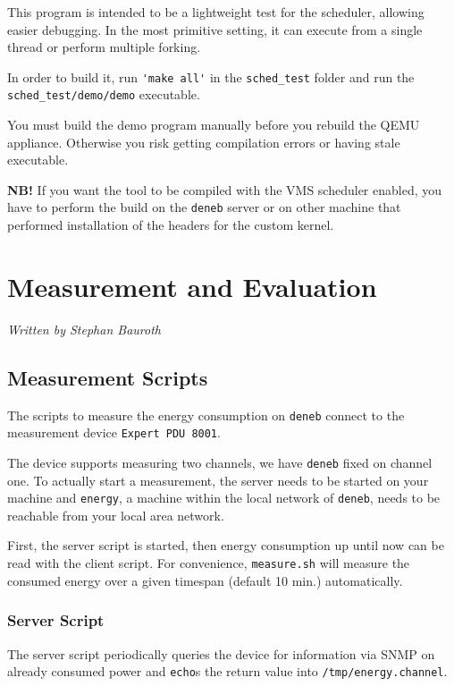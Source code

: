 \documentclass[]{report}
\begin{document}
This program is intended to be a lightweight test for the scheduler,
allowing easier debugging. In the most primitive setting, it can execute
from a single thread or perform multiple forking.

In order to build it, run \lstinline!'make all'! in the
\lstinline!sched_test! folder and run the
\lstinline!sched_test/demo/demo! executable.

You must build the demo program manually before you rebuild the QEMU
appliance. Otherwise you risk getting compilation errors or having stale
executable.

\textbf{NB!} If you want the tool to be compiled with the VMS scheduler
enabled, you have to perform the build on the \lstinline!deneb! server
or on other machine that performed installation of the headers for the
custom kernel.

\chapter{Measurement and Evaluation}\label{measurement-and-evaluation}

\emph{Written by Stephan Bauroth}

\section{Measurement Scripts}\label{measurement-scripts}

The scripts to measure the energy consumption on \lstinline!deneb!
connect to the measurement device \lstinline!Expert PDU 8001!.

The device supports measuring two channels, we have \lstinline!deneb!
fixed on channel one. To actually start a measurement, the server needs
to be started on your machine and \lstinline!energy!, a machine within
the local network of \lstinline!deneb!, needs to be reachable from your
local area network.

First, the server script is started, then energy consumption up until
now can be read with the client script. For convenience,
\lstinline!measure.sh! will measure the consumed energy over a given
timespan (default 10 min.) automatically.

\subsection{Server Script}\label{server-script}

The server script periodically queries the device for information via
SNMP on already consumed power and \lstinline!echo!s the return value
into \lstinline!/tmp/energy.channel!.
\end{document}
